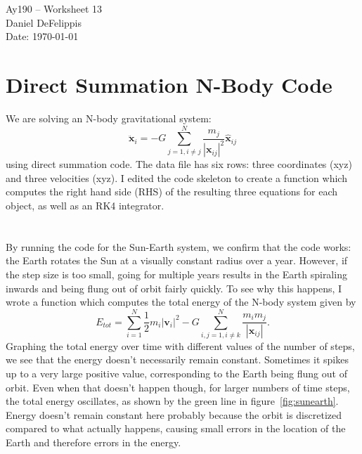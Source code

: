 \documentclass[11pt,letterpaper]{article}
\begin{document}
\begin{center}
\Large
Ay190 -- Worksheet 13\\
Daniel DeFelippis\\
Date: \today
\end{center}


\section*{Direct Summation N-Body Code}


We are solving an N-body gravitational system:
$$ \mathbf{\ddot{x}}_i = -G\sum\limits_{j=1,i \neq j}^{N} \frac{m_j}{|\mathbf{x}_{ij}|^2} \mathbf{\hat{x}}_{ij}$$
using direct summation code. The data file has six rows: three coordinates (xyz) and three 
velocities (xyz). I edited the code skeleton to create a function which 
computes the right hand side (RHS) of the resulting three equations for each object, 
as well as an RK4 integrator. 

\section{}

By running the code for the Sun-Earth system, we confirm that
the code works: the Earth rotates the Sun at a visually constant radius over a year. 
However, if the step size is too small, going for multiple years results in the Earth 
spiraling inwards and being flung out of orbit fairly quickly. To see why this happens, I 
wrote a function which computes the total energy of the N-body system given by 
$$ E_{tot} = \sum\limits_{i=1}^N \frac{1}{2} m_i |\mathbf{v}_i|^2 
             -G\sum\limits_{i,j=1,i\neq k}^N \frac{m_i m_j}{|\mathbf{x}_{ij}|}. $$ 
Graphing the total energy over time with different values of the number of steps, we see
that the energy doesn't necessarily remain constant. Sometimes it spikes up to a very
large positive value, corresponding to the Earth being flung out of orbit. Even when that
doesn't happen though, for larger numbers of time steps, the total energy oscillates, as
shown by the green line in figure~\ref{fig:sunearth}. Energy doesn't remain constant here 
probably because the orbit is discretized compared to what actually happens, causing 
small errors in the location of the Earth and therefore errors in the energy. 
\end{document}
